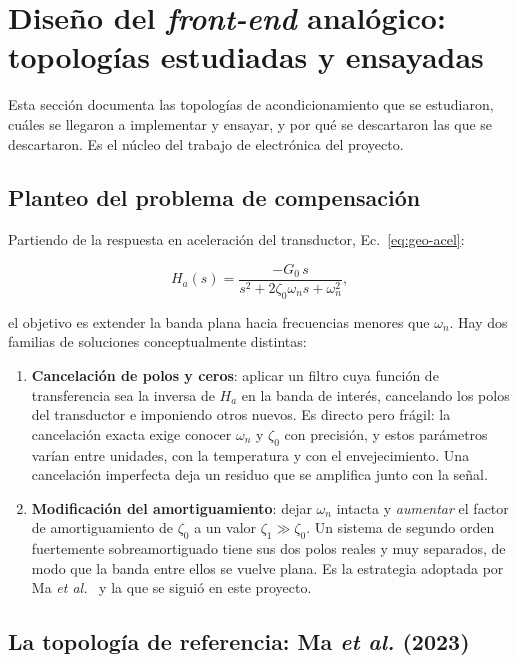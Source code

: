 \section{Dise\~no del \emph{front-end} anal\'ogico: topolog\'ias estudiadas y ensayadas}
\label{sec:topologias}

Esta secci\'on documenta las topolog\'ias de acondicionamiento que se estudiaron, cu\'ales se
llegaron a implementar y ensayar, y por qu\'e se descartaron las que se descartaron. Es el
n\'ucleo del trabajo de electr\'onica del proyecto.

\subsection{Planteo del problema de compensaci\'on}

Partiendo de la respuesta en aceleraci\'on del transductor, Ec.~\eqref{eq:geo-acel}:

\begin{equation}
H_a(s)=\frac{-G_0\,s}{s^{2}+2\zeta_0\omega_n s+\omega_n^{2}},
\end{equation}

el objetivo es extender la banda plana hacia frecuencias menores que $\omega_n$. Hay dos
familias de soluciones conceptualmente distintas:

\begin{enumerate}[itemsep=0.2em]
    \item \textbf{Cancelaci\'on de polos y ceros}: aplicar un filtro cuya funci\'on de
    transferencia sea la inversa de $H_a$ en la banda de inter\'es, cancelando los polos
    del transductor e imponiendo otros nuevos. Es directo pero fr\'agil: la cancelaci\'on
    exacta exige conocer $\omega_n$ y $\zeta_0$ con precisi\'on, y estos par\'ametros varían
    entre unidades, con la temperatura y con el envejecimiento. Una cancelaci\'on
    imperfecta deja un residuo que se amplifica junto con la se\~nal.
    \item \textbf{Modificaci\'on del amortiguamiento}: dejar $\omega_n$ intacta y
    \emph{aumentar} el factor de amortiguamiento de $\zeta_0$ a un valor $\zeta_1\gg\zeta_0$.
    Un sistema de segundo orden fuertemente sobreamortiguado tiene sus dos polos reales y
    muy separados, de modo que la banda entre ellos se vuelve plana. Es la estrategia
    adoptada por Ma \emph{et al.}~\cite{Ma2023} y la que se sigui\'o en este proyecto.
\end{enumerate}

\subsection{La topolog\'ia de referencia: Ma \emph{et al.} (2023)}
\label{sec:ma2023}

